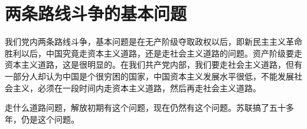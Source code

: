 \section[两条路线斗争的基本问题（一九六七年三月）]{两条路线斗争的基本问题}


我们党内两条路线斗争，基本问题是在无产阶级夺取政权以后，即新民主主义革命胜利以后，中国究竟走资本主义道路，还是走社会主义道路的问题。资产阶级要走资本主义道路，这是很明显的。在我们共产党内部，我们要走社会主义道路，但有一部分人却认为中国是个很穷困的国家，中国资本主义发展水平很低，不能发展社会主义，必须在一段时间内走资本主义道路，然后再走社会主义道路。

走什么道路问题，解放初期有这个问题，现在仍然有这个问题。苏联搞了五十多年，仍是这个问题。

